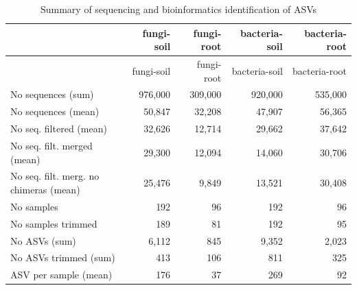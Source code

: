 \documentclass[11pt,]{article}
\begin{document}
\begin{longtable}[]{@{}lrrrr@{}}
\caption{Summary of sequencing and bioinformatics identification of
ASVs}\tabularnewline
\toprule
& fungi-soil & fungi-root & bacteria-soil & bacteria-root\tabularnewline
\midrule
\endfirsthead
\toprule
& fungi-soil & fungi-root & bacteria-soil & bacteria-root\tabularnewline
\midrule
\endhead
No sequences (sum) & 976,000 & 309,000 & 920,000 &
535,000\tabularnewline
No sequences (mean) & 50,847 & 32,208 & 47,907 & 56,365\tabularnewline
No seq. filtered (mean) & 32,626 & 12,714 & 29,662 &
37,642\tabularnewline
No seq. filt. merged (mean) & 29,300 & 12,094 & 14,060 &
30,706\tabularnewline
No seq. filt. merg. no chimeras (mean) & 25,476 & 9,849 & 13,521 &
30,408\tabularnewline
No samples & 192 & 96 & 192 & 96\tabularnewline
No samples trimmed & 189 & 81 & 192 & 95\tabularnewline
No ASVs (sum) & 6,112 & 845 & 9,352 & 2,023\tabularnewline
No ASVs trimmed (sum) & 413 & 106 & 811 & 325\tabularnewline
ASV per sample (mean) & 176 & 37 & 269 & 92\tabularnewline
\bottomrule
\end{longtable}
\end{document}
